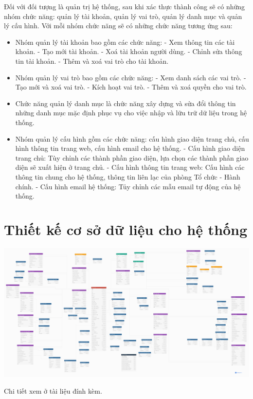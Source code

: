 \indent Đối với đối tượng là quản trị hệ thống, sau khi xác thực thành công sẽ có những nhóm chức năng: quản lý tài khoản, quản lý vai trò, quản lý danh mục và quản lý cấu hình. Với mỗi nhóm chức năng sẽ có những chức năng tương ứng sau:

\begin{itemize}
    \item Nhóm quản lý tài khoản bao gồm các chức năng:
        \subitem - Xem thông tin các tài khoản.
        \subitem - Tạo mới tài khoản.
        \subitem - Xoá tài khoản người dùng.
        \subitem - Chỉnh sửa thông tin tài khoản.
        \subitem - Thêm và xoá vai trò cho tài khoản.
    \item Nhóm quản lý vai trò bao gồm các chức năng:
        \subitem - Xem danh sách các vai trò.
        \subitem - Tạo mới và xoá vai trò.
        \subitem - Kích hoạt vai trò.
        \subitem - Thêm và xoá quyền cho vai trò.
    \item Chức năng quản lý danh mục là chức năng xây dựng và sửa đổi thông tin những danh mục mặc định phục vụ cho việc nhập và lữu trữ dữ liệu trong hệ thống.
    \item Nhóm quản lý cấu hình gồm các chức năng: cấu hình giao diện trang chủ, cấu hình thông tin trang web, cấu hình email cho hệ thống.
        \subitem - Cấu hình giao diện trang chủ: Tùy chỉnh các thành phần giao diện, lựa chọn các thành phần giao diện sẽ xuất hiện ở trang chủ.
        \subitem - Cấu hình thông tin trang web: Cấu hình các thông tin chung cho hệ thống, thông tin liên lạc của phòng Tổ chức - Hành chính.
        \subitem - Cấu hình email hệ thống: Tủy chỉnh các mẫu email tự động của hệ thống.
\end{itemize}
\newpage
\section{Thiết kế cơ sở dữ liệu cho hệ thống}
\begin{center}
  \captionsetup{type=figure}
  \includegraphics[width=15cm]{img/Screen/dbdiagram.png}
\end{center}
Chi tiết xem ở tài liệu đính kèm.
